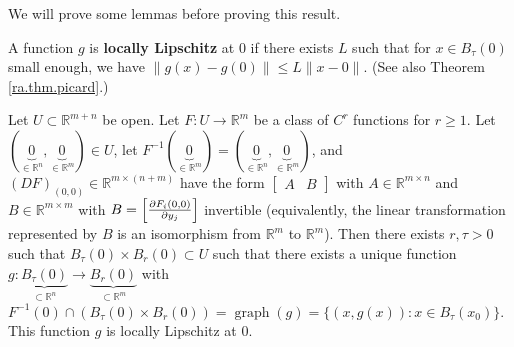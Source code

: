 We will prove some lemmas before proving this result.


\begin{definition}\label{ra.def.loc.lip}

A function \(g\) is \textbf{locally Lipschitz} at 0 if there exists \(L\) such that for \(x \in B_\tau(0)\) small enough, we have \(\lVert g(x) - g(0) \rVert \leq L \lVert x - 0 \rVert\). (See also Theorem \ref{ra.thm.picard}.)

\end{definition}

\begin{lemma}\label{ra.imp.fxn.thm.lm.1}


Let \(U \subset \mathbb{R}^{m+n}\) be open. Let \(F: U \to \mathbb{R}^m\) be a class of \(C^r\) functions for \(r \geq 1\). Let \((\underbrace{0}_{\in \mathbb{R}^n}, \underbrace{0}_{\in \mathbb{R}^m}) \in U\), let \(F^{-1}(\underbrace{0}_{\in \mathbb{R}^m}) = (\underbrace{0}_{\in \mathbb{R}^n}, \underbrace{0}_{\in \mathbb{R}^m})\), and \((DF)_{(0, 0)} \in \mathbb{R}^{m \times (n +m)}\) have the form \(\begin{bmatrix} A & B \end{bmatrix}\) with \(A \in \mathbb{R}^{m \times n}\) and \(B \in \mathbb{R}^{m \times m}\) with \(B = \begin{bmatrix} \pderiv{F_i(0,0)}{y_j} \end{bmatrix}\) invertible (equivalently, the linear transformation represented by \(B\) is an isomorphism from \(\mathbb{R}^m\) to \(\mathbb{R}^m\)). Then there exists \(r, \tau > 0\) such that \(B_\tau(0) \times B_r(0) \subset U\) such that there exists a unique function \(g: \underbrace{B_\tau(0)}_{\subset \mathbb{R}^n} \to \underbrace{B_r(0)}_{\subset \mathbb{R}^m}\) with \(F^{-1}(0) \cap ( B_\tau(0) \times B_r(0)) = \operatorname{graph}(g) = \{(x, g(x)): x \in B_\tau(x_0)\}\). This function \(g\) is locally Lipschitz at 0. 

\end{lemma}

